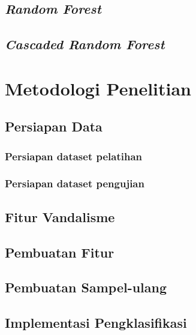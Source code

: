 \section{\textit{Random Forest}}


\section{\textit{Cascaded Random Forest}}



\chapter{Metodologi Penelitian}


\section{Persiapan Data}
\label{persiapan_data}


\subsection{Persiapan dataset pelatihan}


\subsection{Persiapan dataset pengujian}


\section{Fitur Vandalisme}


\section{Pembuatan Fitur}


\section{Pembuatan Sampel-ulang}


\section{Implementasi Pengklasifikasi}


